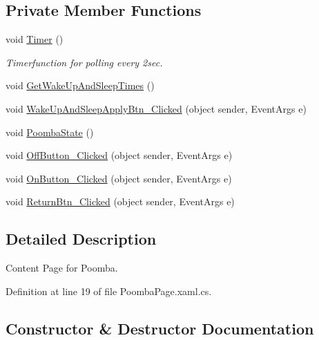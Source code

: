 \subsection*{Private Member Functions}
\begin{DoxyCompactItemize}
\item 
void \mbox{\hyperlink{class_f_w_p_s___app_1_1_poomba_page_a17fb5e8e1d1ff86d5a47adc375726817}{Timer}} ()
\begin{DoxyCompactList}\small\item\em Timerfunction for polling every 2sec. \end{DoxyCompactList}\item 
void \mbox{\hyperlink{class_f_w_p_s___app_1_1_poomba_page_a658c2bff142a310dba6a4474225d6195}{Get\+Wake\+Up\+And\+Sleep\+Times}} ()
\item 
void \mbox{\hyperlink{class_f_w_p_s___app_1_1_poomba_page_a7326d5d8719462577aa4baff9d579c44}{Wake\+Up\+And\+Sleep\+Apply\+Btn\+\_\+\+Clicked}} (object sender, Event\+Args e)
\item 
void \mbox{\hyperlink{class_f_w_p_s___app_1_1_poomba_page_a966462c53c6b6e627d8a92a38076c3a9}{Poomba\+State}} ()
\item 
void \mbox{\hyperlink{class_f_w_p_s___app_1_1_poomba_page_ac4f40bbde2b8d0576378a91b08df26ae}{Off\+Button\+\_\+\+Clicked}} (object sender, Event\+Args e)
\item 
void \mbox{\hyperlink{class_f_w_p_s___app_1_1_poomba_page_a83cd427dfa67807e60dc65216680faf7}{On\+Button\+\_\+\+Clicked}} (object sender, Event\+Args e)
\item 
void \mbox{\hyperlink{class_f_w_p_s___app_1_1_poomba_page_aaab6287e16c9f0714c286680f8b7485f}{Return\+Btn\+\_\+\+Clicked}} (object sender, Event\+Args e)
\end{DoxyCompactItemize}


\subsection{Detailed Description}
Content Page for Poomba. 

Definition at line 19 of file Poomba\+Page.\+xaml.\+cs.



\subsection{Constructor \& Destructor Documentation}
\mbox{\label{class_f_w_p_s___app_1_1_poomba_page_af94209763833dbb195686bfe6aa61410}} 
